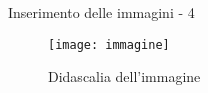 \begin{frame}{Inserimento delle immagini - 4}
	
\begin{figure}[H]
	\centering
	\texttt{[image: immagine]}
	\caption{Didascalia dell'immagine}
\end{figure}

\end{frame}